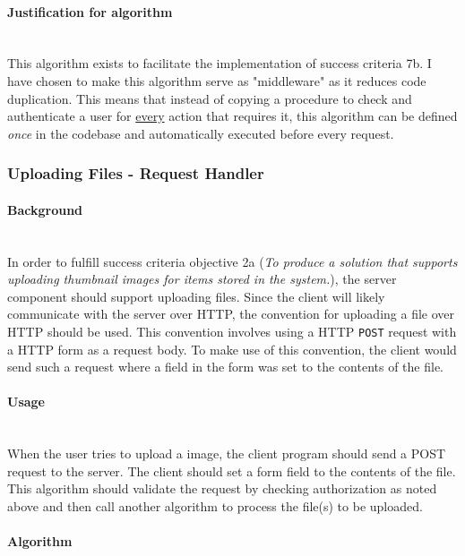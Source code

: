 \documentclass[../../main.tex]{subfiles}
\begin{document}
\paragraph{Justification for algorithm}

\noindent \\ This algorithm exists to facilitate the implementation of success criteria 7b. I have chosen
to make this algorithm serve as "middleware" as it reduces code duplication. This means that instead of copying
a procedure to check and authenticate a user for \underline{every} action that requires it, this algorithm
can be defined \textit{once} in the codebase and automatically executed before every request.

\pagebreak

\subsubsection{Uploading Files - Request Handler}

\paragraph{Background}

\noindent \\ In order to fulfill success criteria objective 2a (\textit{To produce a solution that supports
    uploading thumbnail images for items stored in the system.}), the server component should support uploading
files. Since the client will likely communicate with the server over HTTP, the convention for uploading a file
over HTTP should be used. This convention involves using a HTTP \lstinline{POST} request with a HTTP form as
a request body. To make use of this convention, the client would send such a request where a field in the form
was set to the contents of the file.

\paragraph{Usage}

\noindent \\ When the user tries to upload a image, the client program should send a POST request to the
server. The client should set a form field to the contents of the file. This algorithm should validate the
request by checking authorization as noted above and then call another algorithm to process the file(s) to
be uploaded.

\paragraph{Algorithm\\}
\end{document}
